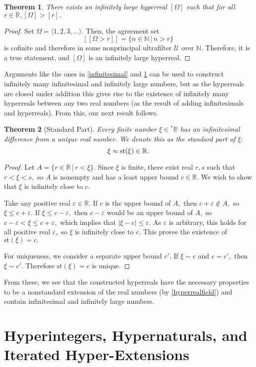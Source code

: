 \documentclass[12pt]{amsart}
\newcommand{\eps}{\varepsilon}
\newcommand{\stt}{{}^*}
\newcommand{\NN}{\mathbb{N}}
\newcommand{\RR}{\mathbb{R}}
\newcommand{\mcU}{\mathcal{U}}
\theoremstyle{plain}
\newtheorem{thm}{Theorem}
\theoremstyle{definition}
\theoremstyle{remark}
\theoremstyle{theorem}
\numberwithin{equation}{section}
\numberwithin{thm}{section}
\begin{document}
\begin{thm}
There exists an infinitely large hyperreal $[\Omega]$ such that for all $r \in \RR, [\Omega] > [r].$ \label{hyperreal}
\end{thm}
\begin{proof}
Set $\Omega = \langle 1,2,3,\ldots \rangle .$ Then, the agreement set 
\[[[\Omega > r]] = \{n \in \NN \, | \, n > r \}\] is cofinite and therefore in some nonprincipal ultrafilter $\mcU$ over $\NN.$ Therefore, it is a true statement, and $[\Omega]$ is an infinitely large hyperreal.
\end{proof}
Arguments like the ones in \ref{infinitesimal} and \ref{hyperreal} can be used to construct infinitely many infinitesimal and infinitely large numbers, but as the hyperreals are closed under addition this gives rise to the existence of infinitely many hyperreals between any two real numbers (as the result of adding infinitesimals and hyperreals). From this, our next result follows.
\begin{thm}[Standard Part]
Every finite number  $\xi \in \stt \RR$ has an infinitesimal difference from a unique real number. We denote this as the standard part of $\xi:$
\[\xi \approx \textnormal{st}(\xi) \in \RR. \]
\end{thm}
\begin{proof}
Let $A = \{r \in \RR \, | \, r < \xi \}.$ Since $\xi$ is finite, there exist real $r,s$ such that $r < \xi < s,$ so $A$ is nonempty and has a least upper bound $c \in \RR.$ We wish to show that $\xi$ is infinitely close to $c.$

Take any positive real $\eps \in \RR.$ If $c$ is the upper bound of $A,$ then $c + \eps\not\in A,$ so $\xi \leq c+\eps.$ If $\xi \leq c-\eps,$ then $c-\eps$ would be an upper bound of $A,$ so $c-\eps < \xi \leq c+\eps,$ which implies that $|\xi-c| \leq \eps.$ As $\eps$ is arbitrary, this holds for all positive real $\eps,$ so $\xi$ is infinitely close to $c.$ This proves the existence of $\text{st}(\xi) = c.$

For uniqueness, we consider a separate upper bound $c'.$ If $\xi \sim c$ and $c = c',$ then $\xi \sim c'.$ Therefore $\text{st}(\xi) = c$ is unique.
\end{proof}
From these, we see that the constructed hyperreals have the necessary properties to be a nonstandard extension of the real numbers (by \ref{hyperrealfield}) and contain infinitesimal and infinitely large numbers.

\section{Hyperintegers, Hypernaturals, and Iterated Hyper-Extensions}
\end{document}
